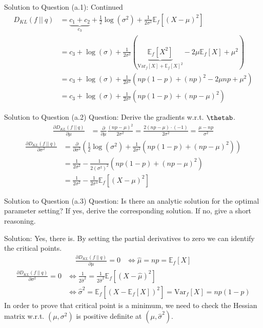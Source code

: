 \documentclass[aspectratio=169]{beamer}
\newcommand{\kld}[1]{D_{KL}\left(#1\right)}
\newcommand{\Ef}{\mathbb{E}_f}
\newcommand{\Varf}{\mathrm{Var}_f}
\begin{document}
\begin{frame}{Solution to Question (a.1): Continued}
	\small
	\begin{align*}
		\kld{f \ || \ q} &= \underbrace{c_1 + c_2}_{c_3}  + \frac{1}{2}\log(\sigma^2) + \frac{1}{2\sigma^2} \Ef[(X - \mu)^2] \\
		&= c_3 + \log(\sigma) + \frac{1}{2\sigma^2} \left( \underbrace{\Ef[X^2]}_{\Varf[X] + \Ef[X]^2} - 2\mu \Ef[X] + \mu^2 \right) \\
		&= c_3 + \log(\sigma) + \frac{1}{2\sigma^2} (np(1 - p) + (np)^2 - 2\mu np + \mu^2) \\
		&= c_3 + \log(\sigma) + \frac{1}{2\sigma^2}(np(1-p) + (np -\mu)^2)
	\end{align*}
\end{frame}

\begin{frame}{Solution to Question (a.2)}
	\small
	Question: Derive the gradients w.r.t. $\thetab$.
	\begin{align*}
		\frac{\partial \kld{ f \ || \ q}}{\partial \mu} &= \frac{\partial}{\partial \mu} \frac{(np - \mu)^2}{2 \sigma^2} = \frac{2 (np - \mu ) \cdot ( -1)}{2\sigma^2} = \frac{ \mu - np}{\sigma^2}
	\end{align*}
	\begin{align*}
		\frac{\partial \kld{f \ || \ q}}{\partial \sigma^2} 
		&= \frac{\partial}{\partial \sigma^2} 
		\left( \frac{1}{2} \log (\sigma^2) + \frac{1}{2 \sigma^2} (np(1 - p) + (np - \mu)^2)  \right) \\
		&= \frac{1}{2\sigma^2} - \frac{1}{2 (\sigma^2)^2}(np (1- p) + (np -\mu)^2) \\
		&= \frac{1}{2\sigma^2} - \frac{1}{2 \sigma^4} \Ef[(X -\mu)^2]
	\end{align*}
\end{frame}

\begin{frame}{Solution to Question (a.3)}
	\small
	Question: Is there an analytic solution for the optimal parameter setting? If yes, derive the corresponding solution. If no, give a short reasoning.
	
	Solution: Yes, there is. By setting the partial derivatives to zero we can identify the critical points.
	\begin{align*}
		\frac{\partial \kld{f \ || \ q}}{\partial \mu} = 0 &\Leftrightarrow \hat{\mu} = np = \Ef[X] 
	\end{align*}
	\begin{align*}
		\frac{\partial \kld{f \ || \ q}}{\partial \sigma^2} = 0 & \Leftrightarrow \frac{1}{2\hat{\sigma}^2} = \frac{1}{2 \hat{\sigma}^2} \Ef[(X - \hat{\mu})^2] \\
		& \Leftrightarrow \hat{\sigma}^2 = \Ef[(X - \Ef[X])^2] = \Varf[X] = np(1-p)
	\end{align*}
	In order to prove that critical point is a minimum, we need to check the Hessian matrix w.r.t. $(\mu, \sigma^2)$ is positive definite at $(\mu, \hat{\sigma}^2)$.
\end{frame}
\end{document}
